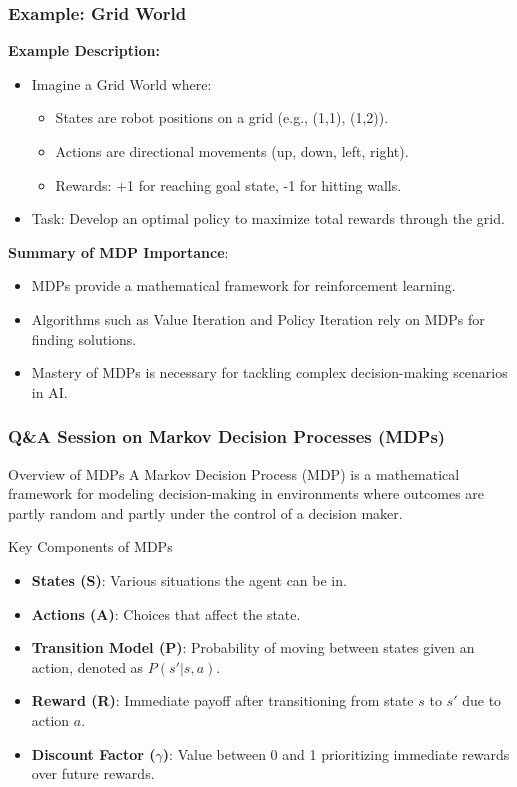 \documentclass[aspectratio=169]{beamer}
\begin{document}
\begin{frame}[fragile]
    \frametitle{Example: Grid World}
    \textbf{Example Description:}
    \begin{itemize}
        \item Imagine a Grid World where:
        \begin{itemize}
            \item States are robot positions on a grid (e.g., (1,1), (1,2)).
            \item Actions are directional movements (up, down, left, right).
            \item Rewards: +1 for reaching goal state, -1 for hitting walls.
        \end{itemize}
        \item Task: Develop an optimal policy to maximize total rewards through the grid.
    \end{itemize}

    \textbf{Summary of MDP Importance}:
    \begin{itemize}
        \item MDPs provide a mathematical framework for reinforcement learning.
        \item Algorithms such as Value Iteration and Policy Iteration rely on MDPs for finding solutions.
        \item Mastery of MDPs is necessary for tackling complex decision-making scenarios in AI.
    \end{itemize}
\end{frame}

\begin{frame}[fragile]
    \frametitle{Q\&A Session on Markov Decision Processes (MDPs)}
    
    \begin{block}{Overview of MDPs}
        A Markov Decision Process (MDP) is a mathematical framework for modeling decision-making in environments where outcomes are partly random and partly under the control of a decision maker.
    \end{block}
    
    \begin{block}{Key Components of MDPs}
        \begin{itemize}
            \item \textbf{States (S)}: Various situations the agent can be in.
            \item \textbf{Actions (A)}: Choices that affect the state.
            \item \textbf{Transition Model (P)}: Probability of moving between states given an action, denoted as \( P(s' | s, a) \).
            \item \textbf{Reward (R)}: Immediate payoff after transitioning from state \( s \) to \( s' \) due to action \( a \).
            \item \textbf{Discount Factor ($\gamma$)}: Value between 0 and 1 prioritizing immediate rewards over future rewards.
        \end{itemize}
    \end{block}
\end{frame}
\end{document}
